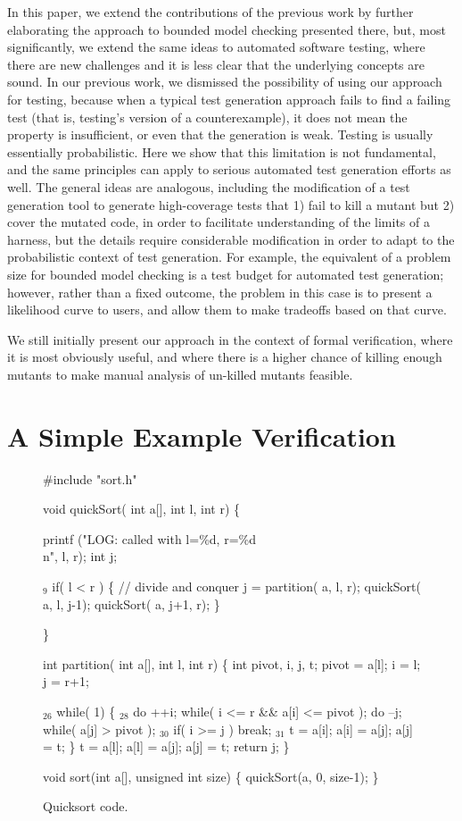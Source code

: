 \documentclass{svjour3}
\begin{document}
In this paper, we extend the contributions of the previous work by
further elaborating the approach to bounded model checking presented
there, but, most significantly, we extend the same ideas to automated
software testing, where there are new challenges and it is less clear
that the underlying concepts are sound.  In our previous work, we
dismissed the possibility of using our approach for testing, because
when a typical test generation approach fails to find a failing test
(that is, testing's version of a counterexample), it does not mean the
property is insufficient, or even that the generation is weak.
Testing is usually essentially probabilistic.  Here we show that this
limitation is not fundamental, and the same principles can apply to
serious automated test generation efforts as well.  The general ideas
are analogous, including the modification of a test generation tool to
generate high-coverage tests that 1) fail to kill a mutant but 2)
cover the mutated code, in order to facilitate understanding of the
limits of a harness, but the details require considerable modification
in order to adapt to the probabilistic context of test generation.
For example, the equivalent of a problem size for bounded model
checking is a test budget for automated test generation; however,
rather than a fixed outcome, the problem in this case is to present a
likelihood curve to users, and allow them to make tradeoffs based on
that curve.

We still initially present our approach in the context of formal
verification, where it is most obviously useful, and where there is a
higher chance of killing enough mutants to make manual analysis of
un-killed mutants feasible.

\section{A Simple Example Verification}

\begin{figure}
{%
\begin{code}
 \#include "sort.h"

 void quickSort( int a[], int l, int r)
 \{

   printf ("LOG: called with l=\%d, r=\%d\\n", l, r); 
   int j;

{$_9$}  if( l < r ) 
     \{
       // divide and conquer
       j = partition( a, l, r);
       quickSort( a, l, j-1);
       quickSort( a, j+1, r);
     \}
  
 \}

 int partition( int a[], int l, int r) \{
   int pivot, i, j, t;
   pivot = a[l];
   i = l; j = r+1;
  
{$_{26}$} while( 1)
     \{
{$_{28}$}     do ++i; while( i <= r \&\& a[i] <= pivot );
       do --j; while( a[j] > pivot );
{$_{30}$}     if( i >= j ) break;
{$_{31}$}     t = a[i]; a[i] = a[j]; a[j] = t;
     \}
   t = a[l]; a[l] = a[j]; a[j] = t;
   return j;
 \}


 void sort(int a[], unsigned int size) \{
   quickSort(a, 0, size-1);
 \}
\end{code}
}
\caption{Quicksort code.}
\label{fig:qsort}
\end{figure}
\end{document}
